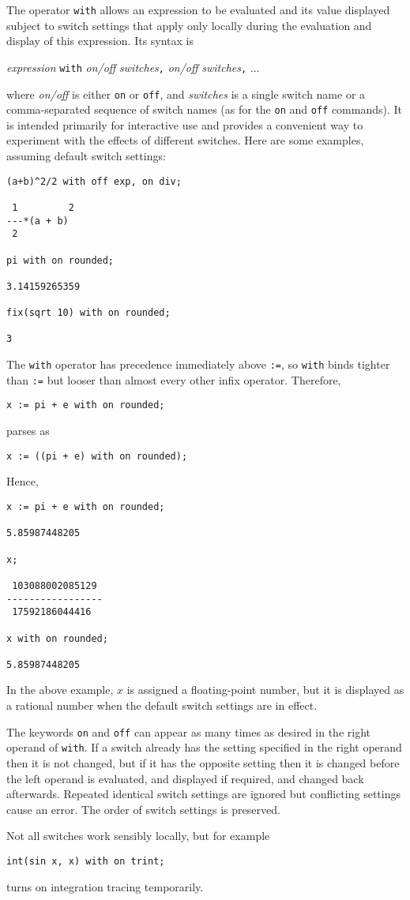 
The operator \texttt{with} allows an expression to be evaluated and
its value displayed subject to switch settings that apply only locally
during the evaluation and display of this expression.  Its syntax is
\begin{center}
  \textit{expression} \texttt{with}
  \textit{on/off} \textit{switches}\texttt{,}
  \textit{on/off} \textit{switches}\texttt{,}
  ...
\end{center}
where \textit{on/off} is either \texttt{on} or \texttt{off}, and
\textit{switches} is a single switch name or a comma-separated
sequence of switch names (as for the \texttt{on} and \texttt{off}
commands).  It is intended primarily for interactive use and provides
a convenient way to experiment with the effects of different switches.
Here are some examples, assuming default switch settings:
\begin{verbatim}
(a+b)^2/2 with off exp, on div;

 1         2
---*(a + b)
 2

pi with on rounded;

3.14159265359

fix(sqrt 10) with on rounded;

3
\end{verbatim}

The \texttt{with} operator has precedence immediately above
\texttt{:=}, so \texttt{with} binds tighter than \texttt{:=} but looser
than almost every other infix operator.  Therefore,
\begin{verbatim}
x := pi + e with on rounded;
\end{verbatim}
parses as
\begin{verbatim}
x := ((pi + e) with on rounded);
\end{verbatim}
Hence,
\begin{verbatim}
x := pi + e with on rounded;

5.85987448205

x;

 103088002085129
-----------------
 17592186044416

x with on rounded;

5.85987448205
\end{verbatim}
In the above example, $x$ is assigned a floating-point number, but it
is displayed as a rational number when the default switch settings are
in effect.

The keywords \texttt{on} and \texttt{off} can appear as many times as
desired in the right operand of \texttt{with}.  If a switch already
has the setting specified in the right operand then it is not changed,
but if it has the opposite setting then it is changed before the left
operand is evaluated, and displayed if required, and changed back
afterwards.  Repeated identical switch settings are ignored but
conflicting settings cause an error.  The order of switch settings is
preserved.

Not all switches work sensibly locally, but for example
\begin{verbatim}
int(sin x, x) with on trint;
\end{verbatim}
turns on integration tracing temporarily.
